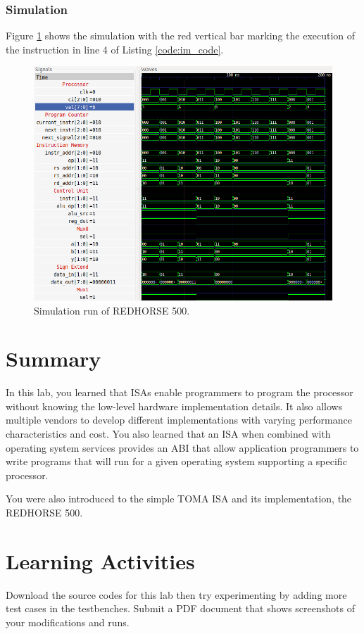 \documentclass[a4paper, 11pt,oneside]{article}
\begin{document}
\subsubsection{Simulation}
Figure \ref{fig:sim} shows the simulation with the red vertical bar marking the 
execution of the instruction in line 4 of Listing \ref{code:im_code}.

\begin{figure}[H]
	\begin{center}
	\includegraphics[width=6in]{sim.png}
	\caption{Simulation run of REDHORSE 500.}
	\label{fig:sim} 
	\end{center}
\end{figure}


\section{Summary}
In this lab, you learned that ISAs enable programmers to program the processor 
without knowing the low-level hardware implementation details. It also allows 
multiple vendors to develop different implementations with varying  
performance characteristics and cost. You also learned that an ISA when 
combined with operating system services provides an ABI that allow application 
programmers to write programs that will run for a given operating system 
supporting a specific processor.

You were also introduced to the simple TOMA ISA and its implementation, 
the REDHORSE 500.

\section{Learning Activities}
Download the source codes for this lab then try experimenting by adding more 
test cases in the testbenches. Submit a PDF document that shows screenshots of 
your modifications and runs. 
\end{document}
